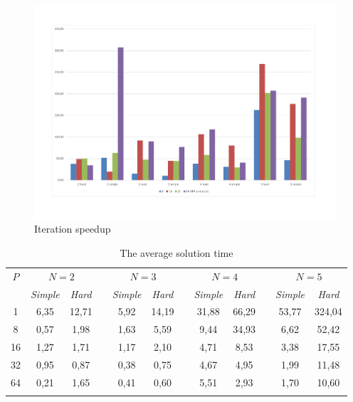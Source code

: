 \documentclass[runningheads]{llncs}
\begin{document}
\begin{figure} 
	\begin{center} 
		\begin{minipage}[h]{0.9\linewidth} 
			\includegraphics[width=1\linewidth]{figure/fig6.pdf} 
			\caption{Iteration speedup} %
			\label{fig:fig4} 
		\end{minipage} 
	\end{center} 
\end{figure}	

\begin{table}
	\caption{The average solution time}
	\label{tab:1}
	\center
	\begin{tabular}{cccccccccccc}
		\hline\noalign{\smallskip}
		$P$ & \multicolumn{2}{c}{ $N=2$ } & & \multicolumn{2}{c}{$N=3$} & & \multicolumn{2}{c}{$N=4$} & & \multicolumn{2}{c}{$N=5$}  \\
		\noalign{\smallskip} \cline{2-3} \cline{5-6} \cline{8-9} \cline{11-12} \noalign{\smallskip}
		& \textit{Simple} & \textit{Hard} & & \textit{Simple} & \textit{Hard} & & \textit{Simple} & \textit{Hard} & & \textit{Simple} & \textit{Hard}  \\
		\noalign{\smallskip} \hline \noalign{\smallskip}
		1   & 6,35 & 12,71 & & 5,92 & 14,19 & & 31,88 & 66,29  & & 53,77 & 324,04 \\
		8   & 0,57 & 1,98  & & 1,63 & 5,59  & & 9,44  & 34,93  & & 6,62 & 52,42 \\
		16  & 1,27 & 1,71  & & 1,17 & 2,10  & & 4,71  & 8,53   & & 3,38 & 17,55 \\
		32  & 0,95 & 0,87  & & 0,38 & 0,75  & & 4,67  & 4,95   & & 1,99 & 11,48 \\
		64  & 0,21 & 1,65  & & 0,41 & 0,60  & & 5,51  & 2,93   & & 1,70 & 10,60 \\
		\noalign{\smallskip}\hline
	\end{tabular}
\end{table}
\end{document}
